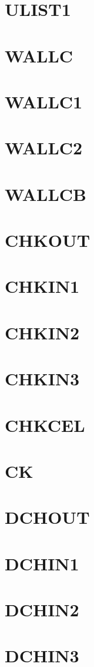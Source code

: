 \documentclass[14pt,UTF8]{ctexbook}
\begin{document}
\section{ULIST1}
\section{WALLC}
\section{WALLC1}
\section{WALLC2}
\section{WALLCB}
\section{CHKOUT}
\section{CHKIN1}
\section{CHKIN2}
\section{CHKIN3}
\section{CHKCEL}
\section{CK}
\section{DCHOUT}
\section{DCHIN1}
\section{DCHIN2}
\section{DCHIN3}
\end{document}
